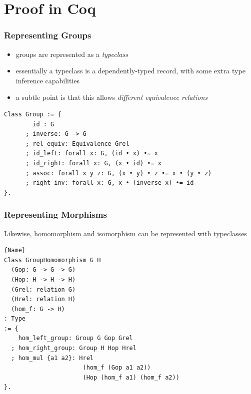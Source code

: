 \documentclass{beamer}
\begin{document}
\section{Proof in Coq}

\begin{frame}[fragile]
\frametitle{Representing Groups}
\begin{itemize}
	\item groups are represented as a \textit{typeclass}
	\item essentially a typeclass is a dependently-typed record, with some extra type inference capabilities
	\item a subtle point is that this allows \textit{different equivalence relations}
\end{itemize}

\begin{lstlisting}[language=Coq]
Class Group := {
        id : G
      ; inverse: G -> G
      ; rel_equiv: Equivalence Grel
      ; id_left: forall x: G, (id • x) •= x
      ; id_right: forall x: G, (x • id) •= x
      ; assoc: forall x y z: G, (x • y) • z •= x • (y • z)
      ; right_inv: forall x: G, x • (inverse x) •= id
}.
\end{lstlisting}
\end{frame}

\begin{frame}[fragile]
\frametitle{Representing Morphisms}

Likewise, homomorphism and isomorphism can be represented with typeclasses

\begin{lstlisting}[language=Coq]{Name}
Class GroupHomomorphism G H
  (Gop: G -> G -> G) 
  (Hop: H -> H -> H) 
  (Grel: relation G)
  (Hrel: relation H)
  (hom_f: G -> H)
: Type 
:= {
    hom_left_group: Group G Gop Grel
  ; hom_right_group: Group H Hop Hrel
  ; hom_mul {a1 a2}: Hrel
                      (hom_f (Gop a1 a2)) 
                      (Hop (hom_f a1) (hom_f a2))
}.
\end{lstlisting}

\end{frame}
\end{document}
